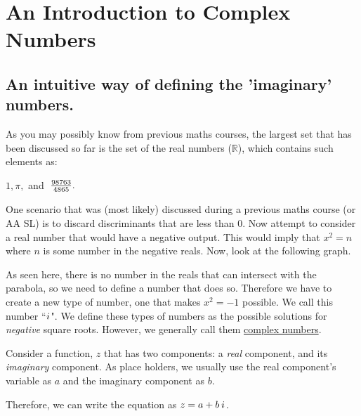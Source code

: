 \documentclass[../main.tex]{subfiles}
\begin{document}
\chapter{An Introduction to Complex Numbers}
\section{An intuitive way of defining the 'imaginary' numbers.}
As you may possibly know from previous maths courses, the largest set that has been discussed so far is the set of the real numbers ($\mathbb{R}$), which contains such elements as:\\
\begin{center}
    $1, \pi,$ and $\hspace{0.3em}\frac{98763}{4865}.$
\end{center}
One scenario that was (most likely) discussed during a previous maths course (or AA SL) is to discard discriminants that are less than 0. Now attempt to consider a real number that would have a negative output. This would imply that $x^{2}=n$ where $n$ is some number in the negative reals. Now, look at the following graph.
\vspace{1em}\\
\begin{center}
\end{center}
As seen here, there is no number in the reals that can intersect with the parabola, so we need to define a number that does so. Therefore we have to create a new type of number, one that makes $x^2=-1$ possible. We call this number ``${i\mkern1mu}$". We define these types of numbers as the possible solutions for \textsl{negative} square roots. However, we generally call them \underline{complex numbers}.
\begin{flushright}
    \begin{tcolorbox}[
    floatplacement=t,
    float,
    colframe = keyIdea,
    title=The definition of a complex number.]
    {
    Consider a function, $z$ that has two components: a \textsl{real} component, and its \textsl{imaginary} component. As place holders, we usually use the real component's variable as $a$ and the imaginary component as $b$.\\
    \hspace{1.3em}
    \begin{center}
        Therefore, we can write the equation as $z = a + b\hspace{0.2em}{i\mkern1mu}$.
    \end{center}
    }
    \end{tcolorbox}
\end{flushright}
\newpage
\setcounter{chapter}{1}
\end{document}
